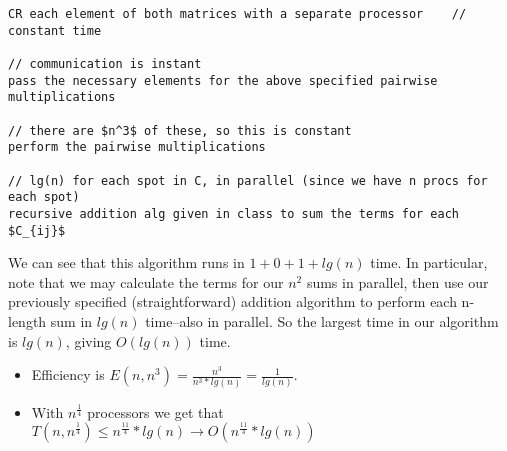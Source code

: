 \documentclass{article}
\begin{document}
\begin{itemize}
\begin{lstlisting}
CR each element of both matrices with a separate processor    // constant time

// communication is instant
pass the necessary elements for the above specified pairwise multiplications

// there are $n^3$ of these, so this is constant
perform the pairwise multiplications

// lg(n) for each spot in C, in parallel (since we have n procs for each spot)
recursive addition alg given in class to sum the terms for each $C_{ij}$
      \end{lstlisting}

We can see that this algorithm runs in $1+0+1+ lg(n)$ time. In particular, note that we may calculate the terms for our $n^2$ sums in parallel, then use our previously specified (straightforward) addition algorithm to perform each n-length sum in $lg(n)$ time--also in parallel. So the largest time in our algorithm is $lg(n)$, giving $O(lg(n))$ time.
\begin{itemize}
  \item Efficiency is $E(n,n^3) = \frac{n^3}{n^3 * lg(n)} = \frac{1}{lg(n)}$.
  \item With $n^{\frac{1}{4}}$ processors we get that $T(n,n^{\frac{1}{4}}) \leq n^{\frac{11}{4}}*lg(n) \rightarrow O(n^{\frac{11}{4}}*lg(n))$
\end{itemize}
\end{itemize}
\end{document}
